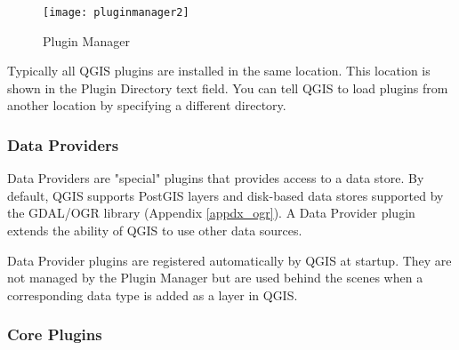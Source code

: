 \begin{figure}[ht]
   \begin{center}
   \caption{Plugin Manager}\label{fig:pluginmanager}\smallskip
   \texttt{[image: pluginmanager2]}
\end{center}  
\end{figure}

Typically all QGIS plugins are installed in the same location. This location
is shown in the Plugin Directory text field. You can tell QGIS to load plugins
from another location by specifying a different directory.

\begin{Tip}\caption{\textsc{Crashing Plugins}}
\end{Tip} 

\subsubsection{Data Providers}

Data Providers are "special" plugins that provides access to a data store. By
default, QGIS supports PostGIS layers and disk-based data stores supported by
the GDAL/OGR library (Appendix \ref{appdx_ogr}). A Data Provider plugin extends the
ability of QGIS to use other data sources.

Data Provider plugins are registered automatically by QGIS at startup. They
are not managed by the Plugin Manager but are used behind the scenes when a
corresponding data type is added as a layer in QGIS.

\subsubsection{Core Plugins}\label{sec:core_plugins}

